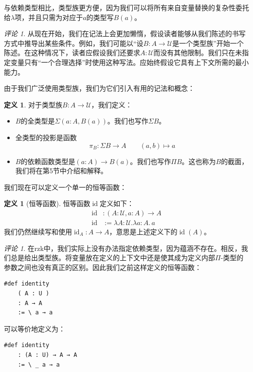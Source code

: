 \documentclass{ctexrep}
\theoremstyle{plain}
\theoremstyle{definition}
\newtheorem{definition}[theorem]{定义}
\theoremstyle{remark}
\newtheorem{remark}[theorem]{评论}
\theoremstyle{definition}
\theoremstyle{definition}
\theoremstyle{definition}
\newcommand{\id}{\operatorname{id}}
\newcommand{\UU}{\mathcal{U}}
\begin{document}
与依赖类型相比，类型族更方便，因为我们可以将所有来自变量替换的复杂性委托给$\lambda$项，并且只需为对应于$a$的类型写$B(a)$。

\begin{remark}
从现在开始，我们在记法上会更加懒惰，假设读者能够从我们陈述的书写方式中推导出某些条件。例如，我们可能以“设$B:A\to\UU$是一个类型族”开始一个陈述。在这种情况下，读者应假设我们还要求$A:\UU$而没有其他限制。我们只在未指定变量只有“一个合理选择”时使用这种写法。应始终假设它具有上下文所需的最小能力。
\end{remark}

由于我们广泛使用类型族，我们为它们引入有用的记法和概念：

\begin{definition}
对于类型族$B:A\to\UU$，我们定义：
\begin{itemize}
\item $B$的全类型是$\Sigma(a:A,B(a))$。我们也写作$\Sigma B$。
\item 全类型的投影是函数\[\pi_B:\Sigma B\to A\qquad (a,b)\mapsto a\]
\item $B$的依赖函数类型是$(a:A)\to B(a)$。我们也写作$\Pi B$。这也称为$B$的截面，我们将在第5节中介绍和解释。
\end{itemize}
\end{definition}

我们现在可以定义一个单一的恒等函数：

\begin{definition}[恒等函数]
恒等函数$\id$定义如下：
\begin{align*}
\id&:(A:\UU,a:A)\to A \\
\id&:=\lambda A:\UU.\lambda a:A.\,a
\end{align*}
我们仍然继续写和使用$\id_A:A\to A$，意思是上述定义下的$\id(A)$。
\end{definition}

\begin{remark}
在rzk中，我们实际上没有办法指定依赖类型，因为蕴涵不存在。相反，我们总是给出类型族。将变量放在定义的上下文中还是使其成为定义内部$\Pi$-类型的参数之间也没有真正的区别。因此我们之前这样定义的恒等函数：
\begin{verbatim}
#def identity
    ( A : U )
    : A → A
    := \ a → a
\end{verbatim}
可以等价地定义为：
\begin{verbatim}
#def identity
    : (A : U) → A → A
    := \ _ a → a
\end{verbatim}
\end{remark}
\end{document}
